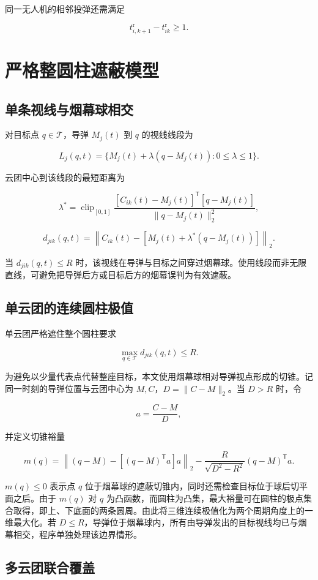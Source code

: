 同一无人机的相邻投弹还需满足

\[
t_{i,k+1}^{\mathrm r}-t_{ik}^{\mathrm r}\ge1.
\]

\section{严格整圆柱遮蔽模型}

\subsection{单条视线与烟幕球相交}

对目标点 $q\in\mathcal T$，导弹 $M_j(t)$ 到 $q$ 的视线线段为

\[
L_j(q,t)=\{M_j(t)+\lambda(q-M_j(t)):0\le\lambda\le1\}.
\]

云团中心到该线段的最短距离为

\[
\lambda^*=\operatorname{clip}_{[0,1]}
\frac{[C_{ik}(t)-M_j(t)]^{\mathsf T}[q-M_j(t)]}
{\|q-M_j(t)\|_2^2},
\]

\[
d_{jik}(q,t)=\left\|C_{ik}(t)-
\left[M_j(t)+\lambda^*(q-M_j(t))\right]\right\|_2.
\]

当 $d_{jik}(q,t)\le R$ 时，该视线在导弹与目标之间穿过烟幕球。使用线段而非无限直线，可避免把导弹后方或目标后方的烟幕误判为有效遮蔽。

\subsection{单云团的连续圆柱极值}

单云团严格遮住整个圆柱要求

\[
\max_{q\in\mathcal T} d_{jik}(q,t)\le R.
\]

为避免以少量代表点代替整座目标，本文使用烟幕球相对导弹视点形成的切锥。记同一时刻的导弹位置与云团中心为 $M,C$，$D=\|C-M\|_2$。当 $D>R$ 时，令

\[
a=\frac{C-M}{D},
\]

并定义切锥裕量

\[
m(q)=\left\|(q-M)-[(q-M)^{\mathsf T}a]a\right\|_2
-\frac{R}{\sqrt{D^2-R^2}}(q-M)^{\mathsf T}a.
\]

$m(q)\le0$ 表示点 $q$ 位于烟幕球的遮蔽切锥内，同时还需检查目标位于球后切平面之后。由于 $m(q)$ 对 $q$ 为凸函数，而圆柱为凸集，最大裕量可在圆柱的极点集合取得，即上、下底面的两条圆周。由此将三维连续极值化为两个周期角度上的一维最大化。若 $D\le R$，导弹位于烟幕球内，所有由导弹发出的目标视线均已与烟幕相交，程序单独处理该边界情形。

\subsection{多云团联合覆盖}

